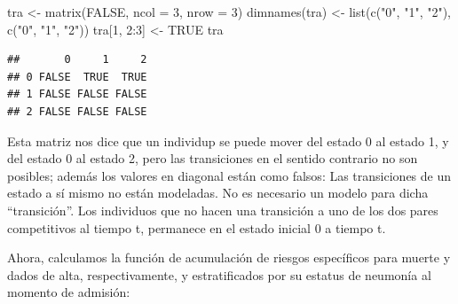 \documentclass[
]{article}
\newenvironment{Shaded}{\begin{snugshade}}{\end{snugshade}}
\newcommand{\AttributeTok}[1]{\textcolor[rgb]{0.77,0.63,0.00}{#1}}
\newcommand{\ConstantTok}[1]{\textcolor[rgb]{0.00,0.00,0.00}{#1}}
\newcommand{\DecValTok}[1]{\textcolor[rgb]{0.00,0.00,0.81}{#1}}
\newcommand{\DocumentationTok}[1]{\textcolor[rgb]{0.56,0.35,0.01}{\textbf{\textit{#1}}}}
\newcommand{\FunctionTok}[1]{\textcolor[rgb]{0.00,0.00,0.00}{#1}}
\newcommand{\NormalTok}[1]{#1}
\newcommand{\OtherTok}[1]{\textcolor[rgb]{0.56,0.35,0.01}{#1}}
\newcommand{\SpecialCharTok}[1]{\textcolor[rgb]{0.00,0.00,0.00}{#1}}
\newcommand{\StringTok}[1]{\textcolor[rgb]{0.31,0.60,0.02}{#1}}
\begin{document}
\begin{Shaded}
\begin{Highlighting}[]
\NormalTok{tra }\OtherTok{\textless{}{-}} \FunctionTok{matrix}\NormalTok{(}\ConstantTok{FALSE}\NormalTok{, }\AttributeTok{ncol =} \DecValTok{3}\NormalTok{, }\AttributeTok{nrow =} \DecValTok{3}\NormalTok{)}
\FunctionTok{dimnames}\NormalTok{(tra) }\OtherTok{\textless{}{-}} \FunctionTok{list}\NormalTok{(}\FunctionTok{c}\NormalTok{(}\StringTok{"0"}\NormalTok{, }\StringTok{"1"}\NormalTok{, }\StringTok{"2"}\NormalTok{), }\FunctionTok{c}\NormalTok{(}\StringTok{"0"}\NormalTok{, }\StringTok{"1"}\NormalTok{, }\StringTok{"2"}\NormalTok{))  }
\NormalTok{tra[}\DecValTok{1}\NormalTok{, }\DecValTok{2}\SpecialCharTok{:}\DecValTok{3}\NormalTok{] }\OtherTok{\textless{}{-}} \ConstantTok{TRUE}
\NormalTok{tra}
\end{Highlighting}
\end{Shaded}

\begin{verbatim}
##       0     1     2
## 0 FALSE  TRUE  TRUE
## 1 FALSE FALSE FALSE
## 2 FALSE FALSE FALSE
\end{verbatim}

Esta matriz nos dice que un individup se puede mover del estado 0 al
estado 1, y del estado 0 al estado 2, pero las transiciones en el
sentido contrario no son posibles; además los valores en diagonal están
como falsos: Las transiciones de un estado a sí mismo no están
modeladas. No es necesario un modelo para dicha ``transición''. Los
individuos que no hacen una transición a uno de los dos pares
competitivos al tiempo t, permanece en el estado inicial 0 a tiempo t.

Ahora, calculamos la función de acumulación de riesgos específicos para
muerte y dados de alta, respectivamente, y estratificados por su estatus
de neumonía al momento de admisión:

\begin{Shaded}
\end{Shaded}
\end{document}
